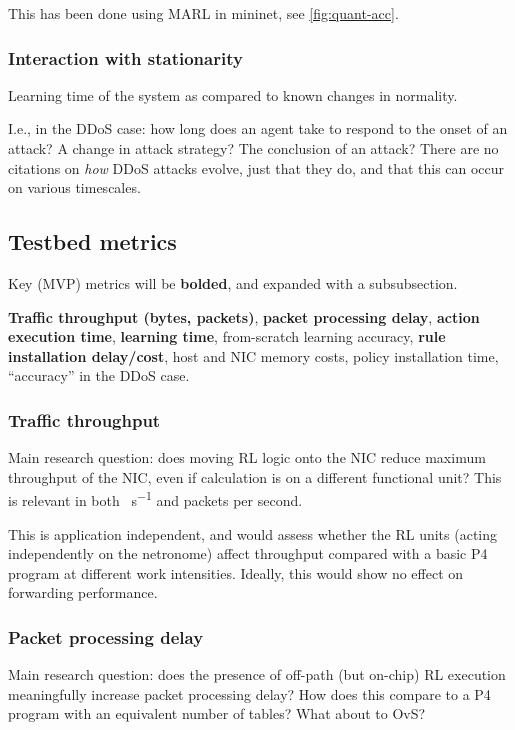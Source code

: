 \documentclass[sigconf,natbib=false]{acmart}
\begin{document}
\begin{appendices}
	This has been done using MARL in mininet, see \cref{fig:quant-acc}.
	
	\subsubsection{Interaction with stationarity}
	Learning time of the system as compared to known changes in normality.
	
	I.e., in the DDoS case: how long does an agent take to respond to the onset of an attack?
	A change in attack strategy?
	The conclusion of an attack?
	There are no citations on \emph{how} DDoS attacks evolve, just that they do, and that this can occur on various timescales.
	
	\subsection{Testbed metrics}
	Key (MVP) metrics will be \textbf{bolded}, and expanded with a subsubsection.
	
	\textbf{Traffic throughput (bytes, packets)}, \textbf{packet processing delay}, \textbf{action execution time}, \textbf{learning time}, from-scratch learning accuracy, \textbf{rule installation delay/cost}, host and NIC memory costs, policy installation time, ``accuracy'' in the DDoS case.
	
	\subsubsection{Traffic throughput}
	Main research question: does moving RL logic onto the NIC reduce maximum throughput of the NIC, even if calculation is on a different functional unit?
	This is relevant in both \si{\byte\per\second} and packets per second.
	
	This is application independent, and would assess whether the RL units (acting independently on the netronome) affect throughput compared with a basic P4 program at different work intensities.
	Ideally, this would show no effect on forwarding performance.
	
	\subsubsection{Packet processing delay}
	Main research question: does the presence of off-path (but on-chip) RL execution meaningfully increase packet processing delay? How does this compare to a P4 program with an equivalent number of tables? What about to OvS?
	

\end{appendices}
\end{document}

